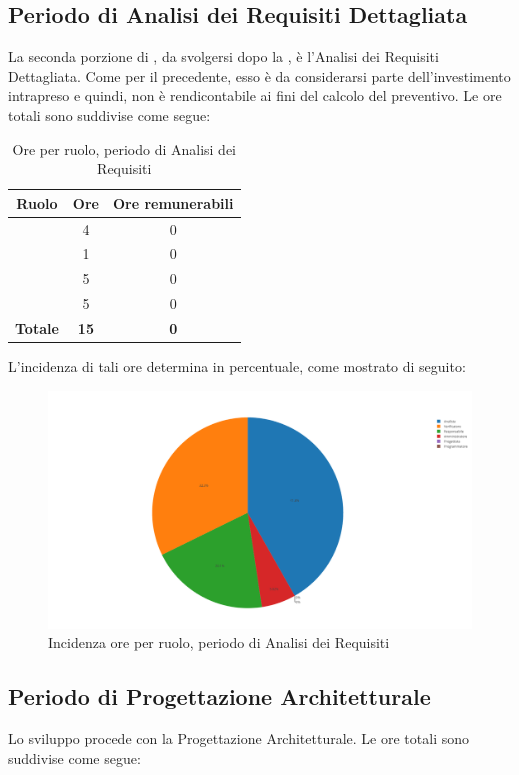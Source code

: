 \subsection{Periodo di Analisi dei Requisiti Dettagliata}
La seconda porzione di \AdR, da svolgersi dopo la \RR, è l'Analisi dei Requisiti Dettagliata. Come per il precedente, esso è da considerarsi parte dell'investimento intrapreso e quindi, non è rendicontabile ai fini del calcolo del preventivo. Le ore totali sono suddivise come segue:

\begin{table}[H]
	\begin{center}
		\begin{tabular}{|c|c|c|}
			\hline
			\textbf{Ruolo}	& \textbf{Ore}	& \textbf{Ore remunerabili} \\
			\hline
			\Res	&   4 	&  0  \\
			\hline
			\Amm	&   1	&  0	\\
			\hline
			\Ana	&   5	&  0	\\
			\hline
			\Ver	&   5	&  0	\\
			\hline
			\textbf{Totale} & \textbf{15} & \textbf{0} \\
			\hline
		\end{tabular}
	\end{center}
	\caption{Ore per ruolo, periodo di Analisi dei Requisiti}
\end{table}

L'incidenza di tali ore determina in percentuale, come mostrato di seguito:
\begin{figure}[H]
	\centering
	\includegraphics[scale=0.6]{img/AnalisiRequisiti.png}
	\caption{Incidenza ore per ruolo, periodo di Analisi dei Requisiti}
\end{figure}

\subsection{Periodo di Progettazione Architetturale}
Lo sviluppo procede con la Progettazione Architetturale. Le ore totali sono suddivise come segue:

